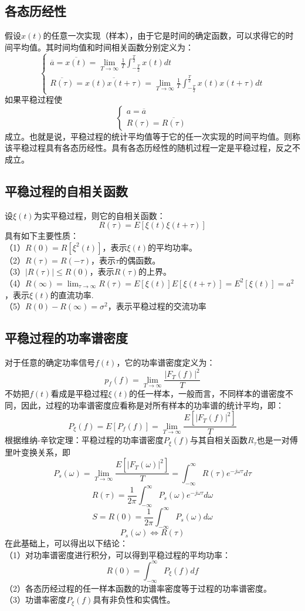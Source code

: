 \documentclass[12pt,a4paper,oneside]{ctexart}
\begin{document}
\subsection{各态历经性}
假设$x(t)$的任意一次实现（样本），由于它是时间的确定函数，可以求得它的时间平均值。其时间均值和时间相关函数分别定义为：
$$
\left\{\begin{matrix}\overline{a}  =  \overline{x(t)}  = \lim_{T \to \infty}\frac{1}{T}\int_{-\frac{T}{2}}^{\frac{T}{2}} x(t)dt
    \\\overline{R(\tau )} = \overline{x(t)x(t+\tau )} = \lim_{T \to \infty }\frac{1}{T}\int_{-\frac{T}{2} }^{\frac{T}{2} }x(t)x(t+\tau )dt     
    \end{matrix}\right.
$$
如果平稳过程使
$$
\left\{\begin{matrix}a = \overline{a} 
    \\R(\tau ) = \overline{R(\tau) } 
   \end{matrix}\right.
$$
成立。也就是说，平稳过程的统计平均值等于它的任一次实现的时间平均值。则称该平稳过程具有各态历经性。具有各态历经性的随机过程一定是平稳过程，反之不成立。
\subsection{平稳过程的自相关函数}
设$\xi(t)$为实平稳过程，则它的自相关函数：
$$
   R(\tau) = E[\xi(t)\xi(t + \tau)]
$$
具有如下主要性质：\\
（1）$R(0) = R[\xi^{2}(t)]$，表示$\xi(t)$的平均功率。\\
（2）$R(\tau) = R(-\tau)$，表示$\tau$的偶函数。\\
（3）$|R(\tau)|\le R(0)$，表示$R(\tau)$的上界。\\
（4）$R(\infty) = \lim_{\tau \to \infty}R(\tau) = E[\xi(t)]E[\xi(t + \tau)] = E^{2}[\xi(t)] = a^{2}$，表示$\xi(t)$的直流功率.\\
（5）$R(0) - R(\infty) = \sigma^{2}$，表示平稳过程的交流功率
\subsection{平稳过程的功率谱密度}
对于任意的确定功率信号$f(t)$，它的功率谱密度定义为：
$$
   p_{f}(f) = \lim_{T \to \infty} \frac{|F_{T}(f)|^{2}}{T}
$$
\indent 不妨把$f(t)$看成是平稳过程$\xi(t)$的任一样本，一般而言，不同样本的谱密度不同，因此，过程的功率谱密度应看称是对所有样本的功率谱的统计平均，即：
$$
   P_{\xi}(f) = E[P_{f}(f)] = \lim_{T \to \infty}\frac{E[|F_{T}(f)|^{2}]}{T}
$$
\indent 根据维纳-辛钦定理：平稳过程的功率谱密度$P_{\xi}(f)$与其自相关函数$R_{\tau}$也是一对傅里叶变换关系，即
$$
   P_{s}(\omega) = \lim_{T \to \infty}\frac{E[|F_{T}(\omega)|^{2}]}{T} = \int_{-\infty}^{\infty}R(\tau)e^{-j\omega\tau}d\tau
$$
$$
   R(\tau) = \frac{1}{2\pi}\int_{-\infty}^{\infty}P_{s}(\omega)e^{-j\omega\tau}d\omega
$$
$$
   S = R(0) = \frac{1}{2\pi}\int_{-\infty}^{\infty}P_{s}(\omega)d\omega
$$
$$
   P_{s}(\omega)\Leftrightarrow R(\tau)
$$
在此基础上，可以得出以下结论：\\
（1）对功率谱密度进行积分，可以得到平稳过程的平均功率：
$$
   R(0) = \int_{-\infty}^{\infty}P_{\xi}(f)df
$$
（2）各态历经过程的任一样本函数的功谱率密度等于过程的功率谱密度。\\
（3）功谱率密度$P_{\xi}(f)$具有非负性和实偶性。
\end{document}
